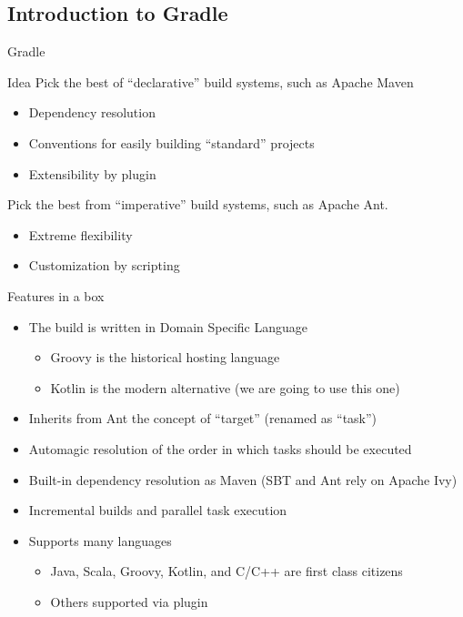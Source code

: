 \documentclass[presentation]{beamer}
\begin{document}
\subsection{Introduction to Gradle}

\begin{frame}{Gradle}
	\begin{block}{Idea}
		Pick the best of ``declarative'' build systems, such as Apache Maven
		\begin{itemize}
			\item Dependency resolution
			\item Conventions for easily building ``standard'' projects
			\item Extensibility by plugin
		\end{itemize}
		Pick the best from ``imperative'' build systems, such as Apache Ant.
		\begin{itemize}
			\item Extreme flexibility
			\item Customization by scripting
		\end{itemize}
	\end{block}
	\begin{block}{Features in a box}
		\begin{itemize}
			\item The build is written in Domain Specific Language
			\begin{itemize}
			    \item Groovy is the historical hosting language
			    \item Kotlin is the modern alternative (we are going to use this one)
			\end{itemize}
			\item Inherits from Ant the concept of ``target'' (renamed as ``task'')
			\item Automagic resolution of the order in which tasks should be executed
			\item Built-in dependency resolution as Maven (SBT and Ant rely on Apache Ivy)
			\item Incremental builds and parallel task execution
			\item Supports many languages
			\begin{itemize}
                \item Java, Scala, Groovy, Kotlin, and C/C++ are first class citizens
                \item Others supported via plugin
			\end{itemize}

\end{itemize}
\end{block}
\end{frame}
\end{document}
